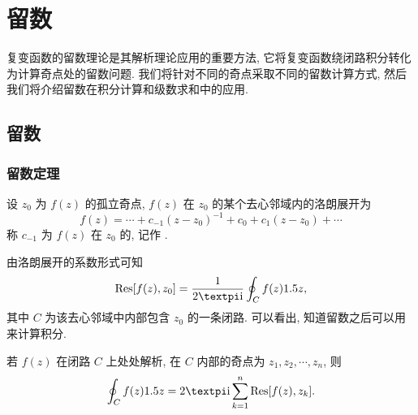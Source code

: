 \chapter{留数}
\label{chapter:5}

复变函数的留数理论是其解析理论应用的重要方法, 它将复变函数绕闭路积分转化为计算奇点处的留数问题.
我们将针对不同的奇点采取不同的留数计算方式, 然后我们将介绍留数在积分计算和级数求和中的应用.



\section{留数}

\subsection{留数定理}

\begin{definition}
  设 $z_0$ 为 $f(z)$ 的孤立奇点, $f(z)$ 在 $z_0$ 的某个去心邻域内的洛朗展开为
  \[
    f(z)=\cdots+c_{-1}(z-z_0)^{-1}+c_0+c_1(z-z_0)+\cdots
  \]
  称 $c_{-1}$ 为 $f(z)$ 在 $z_0$ 的, 记作 \nouns{$\Res[f(z),z_0]$}.
\end{definition}

由洛朗展开的系数形式可知
\[
   \Res[f(z),z_0]
  =\frac1{2\cpi\ii}\oint_C f(z)\d z,
\]
其中 $C$ 为该去心邻域中内部包含 $z_0$ 的一条闭路.
可以看出, 知道留数之后可以用来计算积分.

\begin{theorem}
  \label{thm:residue}
  若 $f(z)$ 在闭路 $C$ 上处处解析, 在 $C$ 内部的奇点为 $z_1,z_2,\cdots,z_n$, 则
  \[
     \oint_C f(z)\d z
    =2\cpi\ii\sum_{k=1}^n\Res[f(z),z_k].
  \]
\end{theorem}

